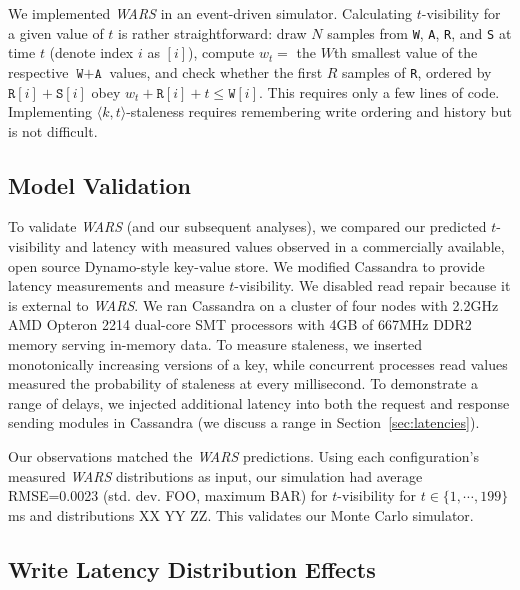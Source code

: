 \documentclass{vldb}
\newcommand{\subsectionskip}{-0em}
\begin{document}
We implemented \textit{WARS} in an event-driven simulator.
Calculating $t$-visibility for a given value of $t$ is rather
straightforward: draw $N$ samples from \texttt{W}, \texttt{A},
\texttt{R}, and \texttt{S} at time $t$ (denote index $i$ as $[i]$),
compute $w_t = $ the $W$th smallest value of the respective
$\texttt{W}+\texttt{A}$ values, and check whether the first $R$
samples of \texttt{R}, ordered by $\texttt{R}[i]+\texttt{S}[i]$ obey
$w_t+\texttt{R}[i] + t\leq \texttt{W}[i]$.  This requires only a few
lines of code.  Implementing $\langle k, t \rangle$-staleness requires
remembering write ordering and history but is not difficult.

\vspace{\subsectionskip}\subsection{Model Validation}

To validate \textit{WARS} (and our subsequent analyses), we compared
our predicted $t$-visibility and latency with measured values observed
in a commercially available, open source Dynamo-style key-value store.
We modified Cassandra to provide latency measurements and measure
$t$-visibility.  We disabled read repair because it is external to
\textit{WARS}.  We ran Cassandra on a cluster of four nodes with
2.2GHz AMD Opteron 2214 dual-core SMT processors with 4GB of 667MHz
DDR2 memory serving in-memory data.  To measure staleness, we inserted
monotonically increasing versions of a key, while concurrent processes
read values measured the probability of staleness at every
millisecond.  To demonstrate a range of delays, we injected additional
latency into both the request and response sending modules in
Cassandra (we discuss a range in Section~\ref{sec:latencies}).

Our observations matched the \textit{WARS} predictions.  Using each
configuration's measured \textit{WARS} distributions as input, our
simulation had average RMSE=0.0023 (std. dev. FOO, maximum BAR) for
$t$-visibility for $t\in\{1,\cdots,199\}$ ms and distributions XX YY
ZZ.  This validates our Monte Carlo simulator.


\vspace{\subsectionskip}\subsection{Write Latency Distribution Effects}
\label{sec:synthetic}
\end{document}
